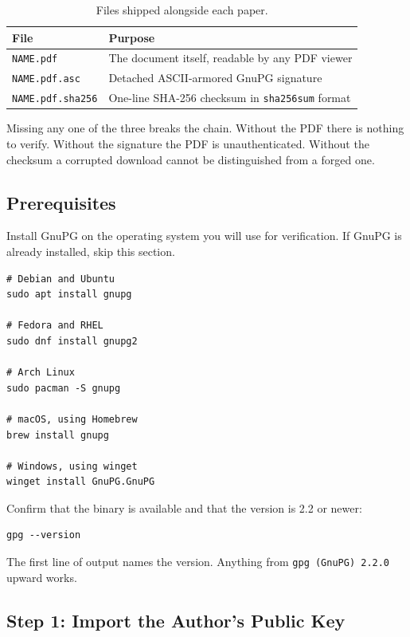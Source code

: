 \begin{table}[H]
	\centering
	\caption{Files shipped alongside each paper.}
	\label{tab:sibling-files}
	\small
	\begin{tabularx}{\textwidth}{@{} l X @{}}
		\toprule
		File                     & Purpose                                                \\
		\midrule
		\texttt{NAME.pdf}        & The document itself, readable by any PDF viewer        \\
		\texttt{NAME.pdf.asc}    & Detached ASCII-armored GnuPG signature                 \\
		\texttt{NAME.pdf.sha256} & One-line SHA-256 checksum in \texttt{sha256sum} format \\
		\bottomrule
	\end{tabularx}
\end{table}

Missing any one of the three breaks the chain. Without the PDF
there is nothing to verify. Without the signature the PDF is
unauthenticated. Without the checksum a corrupted download cannot
be distinguished from a forged one.

\subsection*{Prerequisites}

Install GnuPG on the operating system you will use for
verification. If GnuPG is already installed, skip this section.

\begin{lstlisting}[style=code]
# Debian and Ubuntu
sudo apt install gnupg

# Fedora and RHEL
sudo dnf install gnupg2

# Arch Linux
sudo pacman -S gnupg

# macOS, using Homebrew
brew install gnupg

# Windows, using winget
winget install GnuPG.GnuPG
\end{lstlisting}

Confirm that the binary is available and that the version is 2.2 or
newer:

\begin{lstlisting}[style=code]
gpg --version
\end{lstlisting}

The first line of output names the version. Anything from
\texttt{gpg (GnuPG) 2.2.0} upward works.

\subsection*{Step 1: Import the Author's Public Key}

